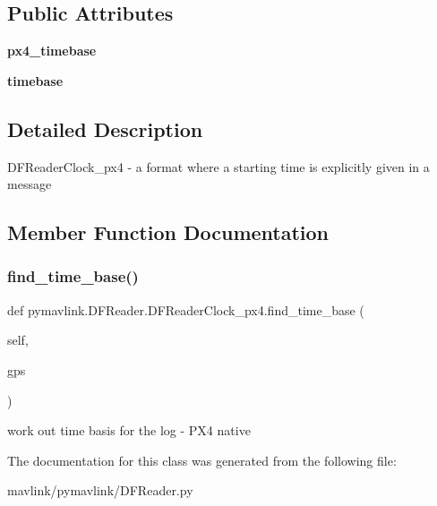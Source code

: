 \subsection*{Public Attributes}
\begin{DoxyCompactItemize}
\item 
\mbox{\label{classpymavlink_1_1DFReader_1_1DFReaderClock__px4_a20353e6a66bef53c589cdaaf1c938503}} 
{\bfseries px4\+\_\+timebase}
\item 
\mbox{\label{classpymavlink_1_1DFReader_1_1DFReaderClock__px4_abfe9c98727c4af5af57c7443f9d45382}} 
{\bfseries timebase}
\end{DoxyCompactItemize}


\subsection{Detailed Description}
\begin{DoxyVerb}DFReaderClock_px4 - a format where a starting time is explicitly given in a message\end{DoxyVerb}
 

\subsection{Member Function Documentation}
\mbox{\label{classpymavlink_1_1DFReader_1_1DFReaderClock__px4_a7c7fbdf0097f50a76ebc096626a7be93}} 
\subsubsection{\texorpdfstring{find\+\_\+time\+\_\+base()}{find\_time\_base()}}
{\footnotesize\ttfamily def pymavlink.\+D\+F\+Reader.\+D\+F\+Reader\+Clock\+\_\+px4.\+find\+\_\+time\+\_\+base (\begin{DoxyParamCaption}\item[{}]{self,  }\item[{}]{gps }\end{DoxyParamCaption})}

\begin{DoxyVerb}work out time basis for the log - PX4 native\end{DoxyVerb}
 

The documentation for this class was generated from the following file\+:\begin{DoxyCompactItemize}
\item 
mavlink/pymavlink/D\+F\+Reader.\+py\end{DoxyCompactItemize}
